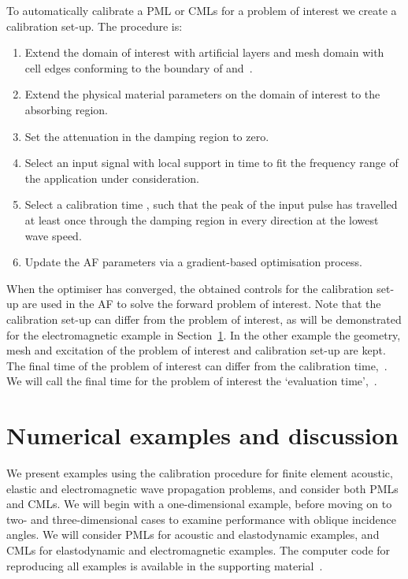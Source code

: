 \documentclass[a4paper]{article}
\begin{document}
To automatically calibrate a PML or CMLs for a problem of interest we
create a calibration set-up. The procedure is:
\begin{enumerate}
\item Extend the domain of interest with artificial layers 
  and mesh domain with cell edges conforming to the boundary of
   and~.

\item Extend the physical material parameters on the domain of
  interest to the absorbing region.

\item Set the attenuation in the damping region to zero.

\item Select an input signal with local support in time to fit the
  frequency range of the application under consideration.

\item Select a calibration time , such that the peak of the
  input pulse has travelled at least once through the damping region
  in every direction at the lowest wave speed.

\item Update the AF parameters via a gradient-based optimisation
  process.
\end{enumerate}
When the optimiser has converged, the obtained controls for the
calibration set-up are used in the AF to solve the forward problem of
interest.  Note that the calibration set-up can differ from the
problem of interest, as will be demonstrated for the electromagnetic
example in Section~\ref{sec:results}. In the other example the
geometry, mesh and excitation of the problem of interest and
calibration set-up are kept. The final time of the problem of interest
can differ from the calibration time,~. We will call the final
time for the problem of interest the `evaluation time',~.

\section{Numerical examples and discussion}
\label{sec:results}

We present examples using the calibration procedure for finite element
acoustic, elastic and electromagnetic wave propagation problems, and
consider both PMLs and CMLs. We will begin with a one-dimensional
example, before moving on to two- and three-dimensional cases to
examine performance with oblique incidence angles.  We will consider
PMLs for acoustic and elastodynamic examples, and CMLs for
elastodynamic and electromagnetic examples. The computer code for
reproducing all examples is available in the supporting
material~\citep{pmlcode}.
\end{document}

